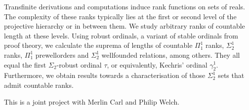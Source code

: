 \documentclass[bsl,meeting]{asl}
\newcommand{\NP}{}
\begin{document}
\thispagestyle{empty}


\NP  
{}


Transfinite derivations and computations induce rank functions on sets of reals.  
The complexity of these ranks typically lies at the first or second level of the projective hierarchy or in between them. 
We study arbitrary ranks of countable length at these levels. 
Using robust ordinals, a variant of stable ordinals from proof theory, we calculate the suprema of lengths of countable $\Pi^1_1$ ranks, $\Sigma^1_2$ ranks, $\Pi^1_1$ prewellorders and $\Sigma^1_2$ wellfounded relations, among others. 
They all equal the first $\Sigma_2$-robust ordinal $\tau$, or equivalently, Kechris' ordinal $\gamma^1_2$. 
Furthermore, we obtain results towards a characterisation of those $\Sigma^1_2$ sets that admit countable ranks. 

This is a joint project with Merlin Carl and Philip Welch. 







\vspace*{-0.5\baselineskip}
\end{document}
